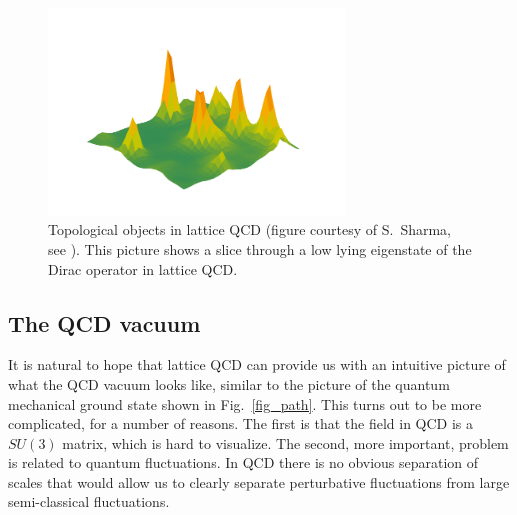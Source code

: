 \begin{figure}[t]
\bc\includegraphics[width=0.7\textwidth]{Chapter2-figures/topology.pdf}\ec
\caption{\label{fig_top}
Topological objects in lattice QCD (figure courtesy of S.~Sharma, 
see \cite{Dick:2015twa}). This picture shows a slice through a 
low lying eigenstate of the Dirac operator in lattice QCD. }
\end{figure}

\subsection{The QCD vacuum}
\label{sec_QCD_vac}

  It is natural to hope that lattice QCD can provide us with an intuitive 
picture of what the QCD vacuum looks like, similar to the picture of the 
quantum mechanical ground state shown in Fig.~\ref{fig_path}. This turns 
out to be more complicated, for a number of reasons. The first is that the 
field in QCD is a $SU(3)$ matrix, which is hard to visualize. The second, 
more important, problem is related to quantum fluctuations. In QCD there
is no obvious separation of scales that would allow us to clearly 
separate perturbative fluctuations from large semi-classical fluctuations.

